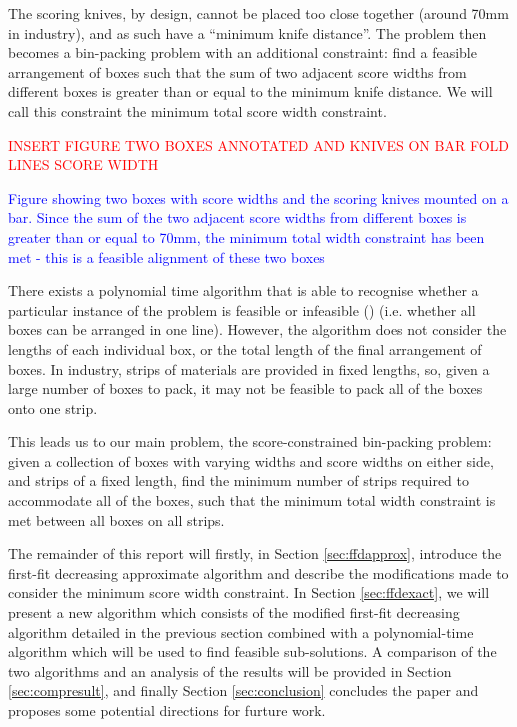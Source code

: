\documentclass[oribibl]{llncs}
\begin{document}
The scoring knives, by design, cannot be placed too close together (around 70mm in industry), and as such have a ``minimum knife distance''. The problem then becomes a bin-packing problem with an additional constraint: find a feasible arrangement of boxes such that the sum of two adjacent score widths from different boxes is greater than or equal to the minimum knife distance. We will call this constraint the minimum total score width constraint.

\textcolor{red}{INSERT FIGURE TWO BOXES ANNOTATED AND KNIVES ON BAR FOLD LINES SCORE WIDTH}

\textcolor{blue}{Figure showing two boxes with score widths and the scoring knives mounted on a bar. Since the sum of the two adjacent score widths from different boxes is greater than or equal to 70mm, the minimum total width constraint has been met - this is a feasible alignment of these two boxes}

There exists a polynomial time algorithm that is able to recognise whether a particular instance of the problem is feasible or infeasible (\citealp{becker2010}) (i.e. whether all boxes can be arranged in one line). However, the algorithm does not consider the lengths of each individual box, or the total length of the final arrangement of boxes. In industry, strips of materials are provided in fixed lengths, so, given a large number of boxes to pack, it may not be feasible to pack all of the boxes onto one strip. 

This leads us to our main problem, the score-constrained bin-packing problem: given a collection of boxes with varying widths and score widths on either side, and strips of a fixed length, find the minimum number of strips required to accommodate all of the boxes, such that the minimum total width constraint is met between all boxes on all strips. 

The remainder of this report will firstly, in Section \ref{sec:ffdapprox}, introduce the first-fit decreasing approximate algorithm and describe the modifications made to consider the minimum score width constraint. In Section \ref{sec:ffdexact}, we will present a new algorithm which consists of the modified first-fit decreasing algorithm detailed in the previous section combined with a polynomial-time algorithm which will be used to find feasible sub-solutions. A comparison of the two algorithms and an analysis of the results will be provided in Section \ref{sec:compresult}, and finally Section \ref{sec:conclusion} concludes the paper and proposes some potential directions for furture work.
\end{document}
